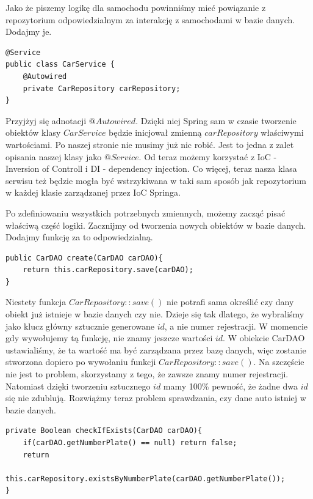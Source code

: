 \documentclass{article}
\begin{document}
        Jako że piszemy logikę dla samochodu powinniśmy mieć powiązanie z repozytorium odpowiedzialnym za interakcję z samochodami w bazie danych. Dodajmy je.
        \begin{verbatim}
@Service
public class CarService {
    @Autowired
    private CarRepository carRepository;  
}

        \end{verbatim}
        
        Przyjżyj się adnotacji $@Autowired$. Dzięki niej Spring sam w czasie tworzenie obiektów klasy $CarService$ będzie inicjował zmienną $carRepository$ właściwymi wartościami. Po naszej stronie nie musimy już nic robić. Jest to jedna z zalet opisania naszej klasy jako $@Service$. Od teraz możemy korzystać z IoC - Inversion of Controll i DI - dependency injection. Co więcej, teraz nasza klasa serwisu też będzie mogła być wstrzykiwana w taki sam sposób jak repozytorium w każdej klasie zarządzanej przez IoC Springa. 
        
        Po zdefiniowaniu wszystkich potrzebnych zmiennych, możemy zacząć pisać właściwą część logiki. Zacznijmy od tworzenia nowych obiektów w bazie danych. Dodajmy funkcję za to odpowiedzialną.
        \begin{verbatim}
public CarDAO create(CarDAO carDAO){
    return this.carRepository.save(carDAO);
}
        \end{verbatim}
        
        Niestety funkcja $CarRepository::save()$ nie potrafi sama określić czy dany obiekt już istnieje w bazie danych czy nie. Dzieje się tak dlatego, że wybraliśmy jako klucz główny sztucznie generowane $id$, a nie numer rejestracji. W momencie gdy wywołujemy tą funkcję, nie znamy jeszcze wartości $id$. W obiekcie CarDAO ustawialiśmy, że ta wartość ma być zarządzana przez bazę danych, więc zostanie stworzona dopiero po wywołaniu funkcji $CarRepository::save()$. Na szczęście nie jest to problem, skorzystamy z tego, że zawsze znamy numer rejestracji. Natomiast dzięki tworzeniu sztucznego $id$ mamy 100\% pewność, że żadne dwa $id$ się nie zdublują. Rozwiążmy teraz problem sprawdzania, czy dane auto istniej w bazie danych.
        \begin{verbatim}
private Boolean checkIfExists(CarDAO carDAO){
    if(carDAO.getNumberPlate() == null) return false;
    return
            this.carRepository.existsByNumberPlate(carDAO.getNumberPlate());
}
        \end{verbatim}
        
\end{document}
